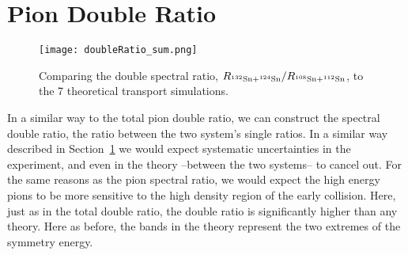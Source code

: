 
\section{Pion Double Ratio}
\label{sec:doubleRatio}

\begin{figure}[!htb]
\centering
\texttt{[image: doubleRatio\_sum.png]}
\caption{Comparing the double spectral ratio, $R_{{}^{132}\mathrm{Sn} + {}^{124}\mathrm{Sn}}/R_{{}^{108}\mathrm{Sn} + {}^{112}\mathrm{Sn}}$, to the 7 theoretical transport simulations.}
\label{fig:spectraDR}
\end{figure}

In a similar way to the total pion double ratio, we can construct the spectral double ratio, the ratio between the two system's single ratios. In a similar way described in Section~\ref{sec:doubleRatio} we would expect systematic uncertainties in the experiment, and even in the theory --between the two systems-- to cancel out. For the same reasons as the pion spectral ratio, we would expect the high energy pions to be more sensitive to the high density region of the early collision. Here, just as in the total double ratio, the double ratio is significantly higher than any theory. Here as before, the bands in the theory represent the two extremes of the symmetry energy. 








